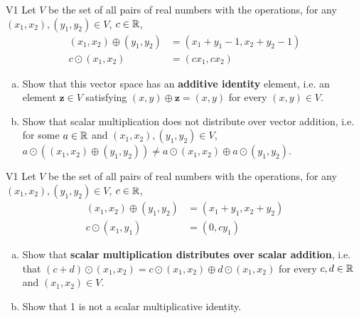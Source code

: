 \begin{problem}{V1}
Let \(V\) be the set of all pairs of real numbers with the operations, for any \((x_1,x_2), (y_1,y_2) \in V\), \(c\in \mathbb{R}\),
\begin{align*}
(x_1,x_2) \oplus (y_1,y_2) &= (x_1+y_1-1,x_2+y_2-1) \\
c \odot (x_1,x_2) &= (cx_1, cx_2)
\end{align*}
\begin{enumerate}[(a)]
\item Show that this vector space has an \textbf{additive identity} element, i.e. an element
      \(\mathbf{z} \in V\) satisfying \((x,y)\oplus\mathbf{z}=(x,y)\) for every \((x,y) \in V\).
\item Show that scalar multiplication does not distribute over vector addition, i.e. for some \(a \in \mathbb{R}\) and \( (x_1,x_2), (y_1,y_2) \in V\), \(a \odot \left( (x_1,x_2)\oplus (y_1,y_2) \right) \neq a \odot (x_1,x_2) \oplus a \odot (y_1,y_2) \).
\end{enumerate}
\end{problem}

\begin{problem}{V1}
Let \(V\) be the set of all pairs of real numbers with the operations, for any \((x_1,x_2), (y_1,y_2) \in V\), \(c\in \mathbb{R}\),
\begin{align*}
(x_1,x_2) \oplus (y_1,y_2) &= (x_1+y_1,x_2+y_2) \\
c \odot (x_1,y_1) &= (0, cy_1)
\end{align*}
\begin{enumerate}[(a)]
\item Show that \textbf{scalar multiplication
      distributes over scalar addition}, i.e. that  
      \((c+d)\odot(x_1,x_2)=
      c\odot(x_1,x_2) \oplus d\odot(x_1,x_2)\) for every \(c,d \in \mathbb{R}\) and \( (x_1,x_2) \in V\).
\item Show that 1 is not a scalar multiplicative identity.
\end{enumerate}
\end{problem}


